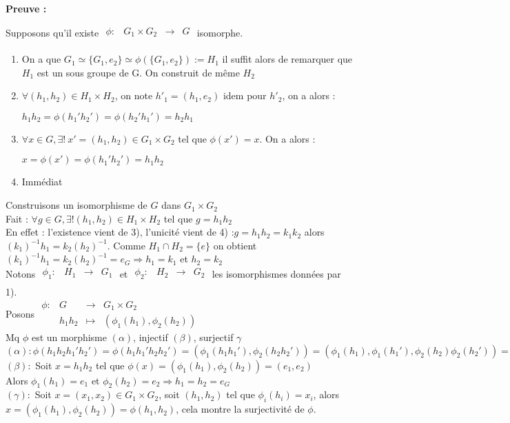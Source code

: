 \documentclass{report}
\newenvironment{preuve}{\begin{tcolorbox}[colframe= white]
    \textbf{Preuve :}
\par }
    {\end{tcolorbox}}
\newcommand{\fonction}[5]{
    \begin{array}{l|rcl}
    #1: & #2 & \longrightarrow & #3 \\
        & #4 & \longmapsto & #5 
    \end{array}
}
\newcommand{\fctsarg}[3]{
    \begin{array}{lrcl}
    #1: & #2 & \longrightarrow & #3 \\
    \end{array}
}
\newcommand{\dsp}{\displaystyle}
\begin{document}
\begin{preuve}
    \fbox{$\Rightarrow$} Supposons qu'il existe $\fctsarg{\phi}{G_1 \times G_2}{G}$ isomorphe.\par
    
    \begin{enumerate}
    \item On a que $ G_{1}\simeq \{G_{1},e_{2}\} \simeq \phi\left(\{G_{1},e_{2}\}\right):=H_{1} $ il suffit alors de remarquer que $H_{1}$ est un sous groupe de G. On construit de même $H_{2}$
    \item$\forall (h_{1},h_{2})\in H_{1}\times H_{2}$, on note $h'_{1}= (h_{1},e_{2})$ idem pour $h'_{2}$, on a alors : 
    \begin{center}
    $\dsp h_1 h_2 = \phi(h_1 'h_2 ') = \phi(h_2 'h_1 ') = h_2 h_1 $
    \end{center}
    
    \item $\forall x \in G, \exists!~x'=(h_{1},h_{2})\in G_{1}\times G_{2}$ tel que $\phi(x')=x$. On a alors :  \par
    \begin{center}
    $\dsp x = \phi(x') = \phi(h_{1}'h_{2}') = h_{1}h_{2} $
    \end{center}
    \item Immédiat
    \end{enumerate}
    \noindent\fbox{$\Leftarrow$} Construisons un isomorphisme de $G$ dans $G_1 \times G_2$\\
    Fait : $\forall g\in G, \exists! (h_1,h_2)\in H_1 \times H_2 $ tel que $g = h_1 h_2$\\
    En effet : l'existence vient de 3), l'unicité vient de 4) :$g = h_1 h_2 = k_1 k_2$ alors $(k_1)^{-1} h_1 = k_2 (h_2)^{-1}$. Comme $H_1 \cap H_2 = \{e\}$ on obtient $(k_1)^{-1} h_1 = k_2 (h_2)^{-1} = e_G \Rightarrow h_1 = k_1 $ et $h_2 = k_2$\\
    Notons $\fctsarg{\phi_1}{H_1}{G_1}$ et $\fctsarg{\phi_2}{H_2}{G_2}$ les isomorphismes données par 1).\\
    Posons $\fonction{\phi}{G}{G_1 \times G_2}{h_1 h_2}{(\phi_1 (h_1),\phi_2 (h_2))}$\\
    Mq $\phi$ est un morphisme $(\alpha)$, injectif $(\beta)$, surjectif $\gamma$\\
    $(\alpha): \phi(h_1 h_2 h_1 'h_2 ') =\phi(h_1 h_1 'h_2 h_2') = (\phi_1(h_1 h_1'),\phi_2(h_2 h_2 ')) = (\phi_1(h_1),\phi_1(h_1 '),\phi_2(h_2)\phi_2(h_2 ')) = (\phi_1 (h_1),\phi_2 (h_2)) (\phi_1 (h_1 '),\phi_2(h_2 ')) = \phi(g)\phi(g')$\\
    $(\beta):$ Soit $x = h_1 h_2$ tel que $\phi(x) = (\phi_1 (h_1),\phi_2 (h_2)) = (e_1,e_2)$\\
    Alors $\phi_1(h_1) = e_1$ et $\phi_2 (h_2) = e_2 \Rightarrow h_1 = h_2 = e_G$\\
    $(\gamma):$ Soit $x = (x_1,x_2) \in G_1 \times G_2$, soit $(h_1,h_2)$ tel que $\phi_i (h_i) = x_i$, alors $x = (\phi_1 (h_1),\phi_2 (h_2)) = \phi(h_1,h_2)$, cela montre la surjectivité de $\phi$.
\end{preuve}
\end{document}
